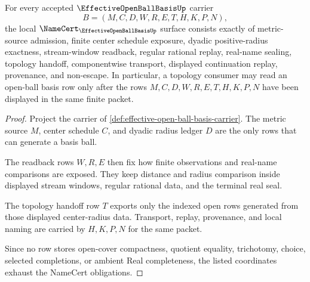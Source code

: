 \begin{theorem}
\label{thm:effective-open-ball-basis-namecert-obligations}
For every accepted $\EffectiveOpenBallBasisUp$ carrier
$$
B=(M,C,D,W,R,E,T,H,K,P,N),
$$
the local $\NameCert_{\EffectiveOpenBallBasisUp}$ surface consists exactly of metric-source admission, finite center schedule exposure, dyadic positive-radius exactness, stream-window readback, regular rational replay, real-name sealing, topology handoff, componentwise transport, displayed continuation replay, provenance, and non-escape. In particular, a topology consumer may read an open-ball basis row only after the rows $M,C,D,W,R,E,T,H,K,P,N$ have been displayed in the same finite packet.
\end{theorem}
\begin{proof}
Project the carrier of \autoref{def:effective-open-ball-basis-carrier}. The metric source $M$, center schedule $C$, and dyadic radius ledger $D$ are the only rows that can generate a basis ball.

The readback rows $W,R,E$ then fix how finite observations and real-name comparisons are exposed. They keep distance and radius comparison inside displayed stream windows, regular rational data, and the terminal real seal.

The topology handoff row $T$ exports only the indexed open rows generated from those displayed center-radius data. Transport, replay, provenance, and local naming are carried by $H,K,P,N$ for the same packet.

Since no row stores open-cover compactness, quotient equality, trichotomy, choice, selected completions, or ambient Real completeness, the listed coordinates exhaust the NameCert obligations.
\end{proof}

